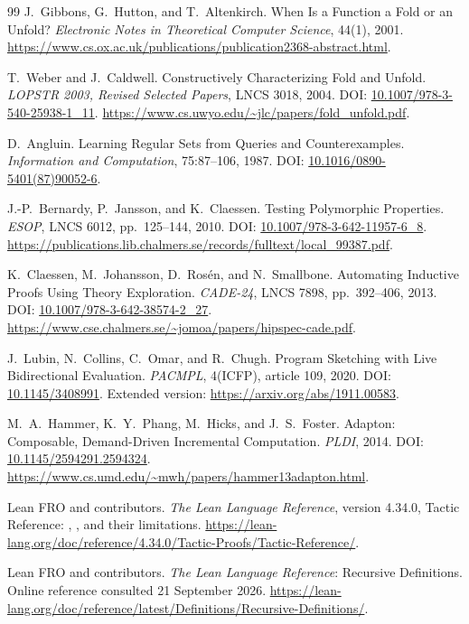 \documentclass[11pt,a4paper]{article}
\theoremstyle{definition}
\theoremstyle{remark}
\newcommand{\code}[1]{\texttt{\detokenize{#1}}}
\begin{document}
\begin{thebibliography}{99}
J.~Gibbons, G.~Hutton, and T.~Altenkirch. When Is a Function a Fold or an
Unfold? \emph{Electronic Notes in Theoretical Computer Science}, 44(1), 2001.
\url{https://www.cs.ox.ac.uk/publications/publication2368-abstract.html}.

T.~Weber and J.~Caldwell. Constructively Characterizing Fold and Unfold.
\emph{LOPSTR 2003, Revised Selected Papers}, LNCS 3018, 2004.
DOI: \href{https://doi.org/10.1007/978-3-540-25938-1_11}{10.1007/978-3-540-25938-1\_11}.
\url{https://www.cs.uwyo.edu/~jlc/papers/fold_unfold.pdf}.

D.~Angluin. Learning Regular Sets from Queries and Counterexamples.
\emph{Information and Computation}, 75:87--106, 1987.
DOI: \href{https://doi.org/10.1016/0890-5401(87)90052-6}{10.1016/0890-5401(87)90052-6}.

J.-P.~Bernardy, P.~Jansson, and K.~Claessen. Testing Polymorphic Properties.
\emph{ESOP}, LNCS 6012, pp.~125--144, 2010.
DOI: \href{https://doi.org/10.1007/978-3-642-11957-6_8}{10.1007/978-3-642-11957-6\_8}.
\url{https://publications.lib.chalmers.se/records/fulltext/local_99387.pdf}.

K.~Claessen, M.~Johansson, D.~Ros\'en, and N.~Smallbone. Automating Inductive
Proofs Using Theory Exploration. \emph{CADE-24}, LNCS 7898, pp.~392--406, 2013.
DOI: \href{https://doi.org/10.1007/978-3-642-38574-2_27}{10.1007/978-3-642-38574-2\_27}.
\url{https://www.cse.chalmers.se/~jomoa/papers/hipspec-cade.pdf}.

J.~Lubin, N.~Collins, C.~Omar, and R.~Chugh. Program Sketching with Live
Bidirectional Evaluation. \emph{PACMPL}, 4(ICFP), article 109, 2020.
DOI: \href{https://doi.org/10.1145/3408991}{10.1145/3408991}.
Extended version: \url{https://arxiv.org/abs/1911.00583}.

M.~A.~Hammer, K.~Y.~Phang, M.~Hicks, and J.~S.~Foster. Adapton: Composable,
Demand-Driven Incremental Computation. \emph{PLDI}, 2014.
DOI: \href{https://doi.org/10.1145/2594291.2594324}{10.1145/2594291.2594324}.
\url{https://www.cs.umd.edu/~mwh/papers/hammer13adapton.html}.

Lean FRO and contributors. \emph{The Lean Language Reference}, version 4.34.0,
Tactic Reference: \code{cbv}, \code{decide_cbv}, and their limitations.
\url{https://lean-lang.org/doc/reference/4.34.0/Tactic-Proofs/Tactic-Reference/}.

Lean FRO and contributors. \emph{The Lean Language Reference}: Recursive
Definitions. Online reference consulted 21 September 2026.
\url{https://lean-lang.org/doc/reference/latest/Definitions/Recursive-Definitions/}.


\end{thebibliography}
\end{document}
